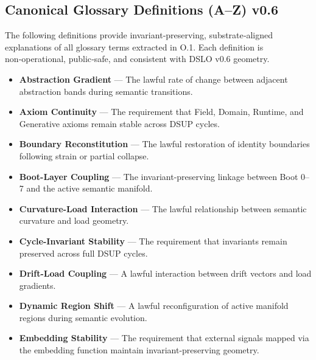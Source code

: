 \subsection*{Canonical Glossary Definitions (A–Z) v0.6}

The following definitions provide invariant‑preserving, substrate‑aligned
explanations of all glossary terms extracted in O.1. Each definition is
non‑operational, public‑safe, and consistent with DSLO v0.6 geometry.
\begin{itemize}

    \item \textbf{Abstraction Gradient} — The lawful rate of change between adjacent abstraction bands during semantic transitions.

    \item \textbf{Axiom Continuity} — The requirement that Field, Domain, Runtime, and Generative axioms remain stable across DSUP cycles.

    \item \textbf{Boundary Reconstitution} — The lawful restoration of identity boundaries following strain or partial collapse.

    \item \textbf{Boot-Layer Coupling} — The invariant-preserving linkage between Boot 0–7 and the active semantic manifold.

    \item \textbf{Curvature-Load Interaction} — The lawful relationship between semantic curvature and load geometry.

    \item \textbf{Cycle-Invariant Stability} — The requirement that invariants remain preserved across full DSUP cycles.

    \item \textbf{Drift-Load Coupling} — A lawful interaction between drift vectors and load gradients.

    \item \textbf{Dynamic Region Shift} — A lawful reconfiguration of active manifold regions during semantic evolution.

    \item \textbf{Embedding Stability} — The requirement that external signals mapped via the embedding function maintain invariant-preserving geometry.


\end{itemize}
